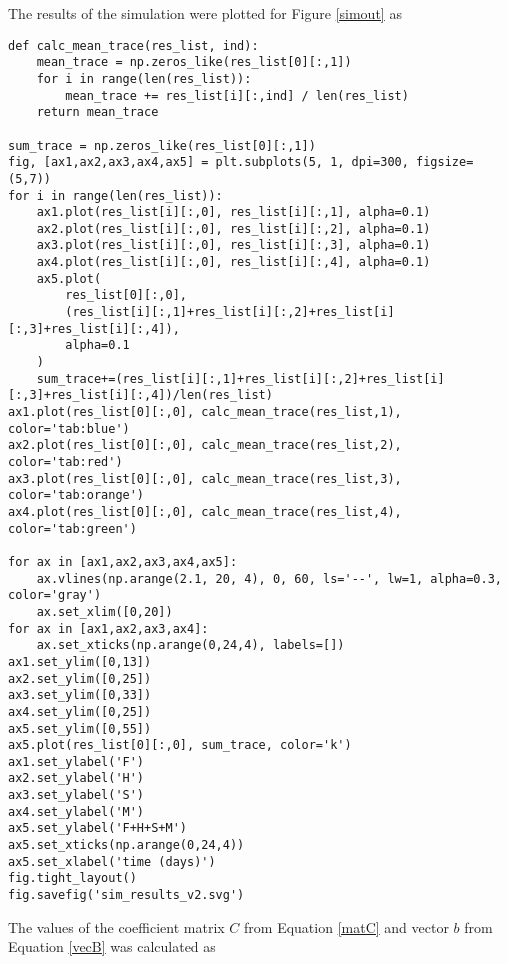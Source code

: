 \documentclass[11pt]{article}
\begin{document}
The results of the simulation were plotted for Figure \ref{simout} as
\begin{Verbatim}[frame=single]
def calc_mean_trace(res_list, ind):
    mean_trace = np.zeros_like(res_list[0][:,1])
    for i in range(len(res_list)):
        mean_trace += res_list[i][:,ind] / len(res_list)
    return mean_trace

sum_trace = np.zeros_like(res_list[0][:,1])
fig, [ax1,ax2,ax3,ax4,ax5] = plt.subplots(5, 1, dpi=300, figsize=(5,7))
for i in range(len(res_list)):
    ax1.plot(res_list[i][:,0], res_list[i][:,1], alpha=0.1)
    ax2.plot(res_list[i][:,0], res_list[i][:,2], alpha=0.1)
    ax3.plot(res_list[i][:,0], res_list[i][:,3], alpha=0.1)
    ax4.plot(res_list[i][:,0], res_list[i][:,4], alpha=0.1)
    ax5.plot(
        res_list[0][:,0],
        (res_list[i][:,1]+res_list[i][:,2]+res_list[i][:,3]+res_list[i][:,4]),
        alpha=0.1
    )
    sum_trace+=(res_list[i][:,1]+res_list[i][:,2]+res_list[i][:,3]+res_list[i][:,4])/len(res_list)
ax1.plot(res_list[0][:,0], calc_mean_trace(res_list,1), color='tab:blue')
ax2.plot(res_list[0][:,0], calc_mean_trace(res_list,2), color='tab:red')
ax3.plot(res_list[0][:,0], calc_mean_trace(res_list,3), color='tab:orange')
ax4.plot(res_list[0][:,0], calc_mean_trace(res_list,4), color='tab:green')

for ax in [ax1,ax2,ax3,ax4,ax5]:
    ax.vlines(np.arange(2.1, 20, 4), 0, 60, ls='--', lw=1, alpha=0.3, color='gray')
    ax.set_xlim([0,20])
for ax in [ax1,ax2,ax3,ax4]:
    ax.set_xticks(np.arange(0,24,4), labels=[])
ax1.set_ylim([0,13])
ax2.set_ylim([0,25])
ax3.set_ylim([0,33])
ax4.set_ylim([0,25])
ax5.set_ylim([0,55])
ax5.plot(res_list[0][:,0], sum_trace, color='k')
ax1.set_ylabel('F')
ax2.set_ylabel('H')
ax3.set_ylabel('S')
ax4.set_ylabel('M')
ax5.set_ylabel('F+H+S+M')
ax5.set_xticks(np.arange(0,24,4))
ax5.set_xlabel('time (days)')
fig.tight_layout()
fig.savefig('sim_results_v2.svg')
\end{Verbatim}
The values of the coefficient matrix $C$ from Equation \ref{matC} and vector $b$ from Equation \ref{vecB} was calculated as
\end{document}
